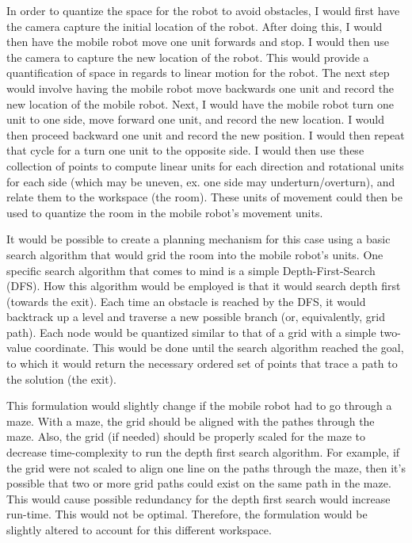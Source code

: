 \documentclass[10pt]{article}
\begin{document}
In order to quantize the space for the robot to avoid obstacles, I would first have the camera capture the initial location of the robot. After doing this, I would then have the mobile robot move one unit forwards and stop.  I would then use the camera to capture the new location of the robot. This would provide a quantification of space in regards to linear motion for the robot.  The next step would involve having the mobile robot move backwards one unit and record the new location of the mobile robot. Next, I would have the mobile robot turn one unit to one side, move forward one unit, and record the new location. I would then proceed backward one unit and record the new position.  I would then repeat that cycle for a turn one unit to the opposite side.  I would then use these collection of points to compute linear units for each direction and rotational units for each side (which may be uneven, ex. one side may underturn/overturn), and relate them to the workspace (the room).  These units of movement could then be used to quantize the room in the mobile robot's movement units.

It would be possible to create a planning mechanism for this case using a basic search algorithm that would grid the room into the mobile robot's units. One specific search algorithm that comes to mind is a simple Depth-First-Search (DFS).  How this algorithm would be employed is that it would search depth first (towards the exit).  Each time an obstacle is reached by the DFS, it would backtrack up a level and traverse a new possible branch (or, equivalently, grid path). Each node would be quantized similar to that of a grid with a simple two-value coordinate. This would be done until the search algorithm reached the goal, to which it would return the necessary ordered set of points that trace a path to the solution (the exit).

This formulation would slightly change if the mobile robot had to go through a maze. With a maze, the grid should be aligned with the pathes through the maze. Also, the grid (if needed) should be properly scaled for the maze to decrease time-complexity to run the depth first search algorithm. For example, if the grid were not scaled to align one line on the paths through the maze, then it's possible that two or more grid paths could exist on the same path in the maze.  This would cause possible redundancy for the depth first search would increase run-time. This would not be optimal. Therefore, the formulation would be slightly altered to account for this different workspace.


\end{document}
